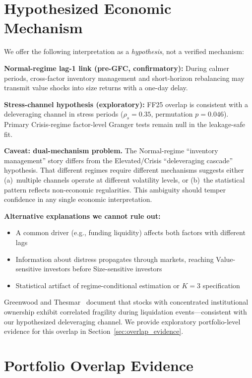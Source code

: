 \documentclass[sigconf,anonymous]{acmart}
\begin{document}
\appendix

\section{Hypothesized Economic Mechanism}
\label{app:mechanism}

We offer the following interpretation as a \emph{hypothesis}, not a verified mechanism:

\textbf{Normal-regime lag-1 link (pre-GFC, confirmatory):} During calmer periods,
cross-factor inventory management and short-horizon rebalancing may transmit
value shocks into size returns with a one-day delay.

\textbf{Stress-channel hypothesis (exploratory):} FF25 overlap is consistent with
a deleveraging channel in stress periods
($\rho_s = 0.35$, permutation $p = 0.046$). Primary Crisis-regime factor-level
Granger tests remain null in the leakage-safe fit.

\textbf{Caveat: dual-mechanism problem.} The Normal-regime ``inventory management''
story differs from the Elevated/Crisis ``deleveraging cascade'' hypothesis.
That different regimes require different mechanisms suggests either (a)~multiple
channels operate at different volatility levels, or (b)~the statistical pattern
reflects non-economic regularities. This ambiguity should temper confidence in
any single economic interpretation.

\textbf{Alternative explanations we cannot rule out:}
\begin{itemize}
    \item A common driver (e.g., funding liquidity) affects both factors with different lags
    \item Information about distress propagates through markets, reaching Value-sensitive
    investors before Size-sensitive investors
    \item Statistical artifact of regime-conditional estimation or $K = 3$ specification
\end{itemize}

Greenwood and Thesmar~\cite{greenwood2011stock} document that stocks with
concentrated institutional ownership exhibit correlated fragility during
liquidation events---consistent with our hypothesized deleveraging channel.
We provide exploratory portfolio-level evidence for this overlap in
Section~\ref{sec:overlap_evidence}.

\section{Portfolio Overlap Evidence}
\label{app:overlap}
\end{document}
